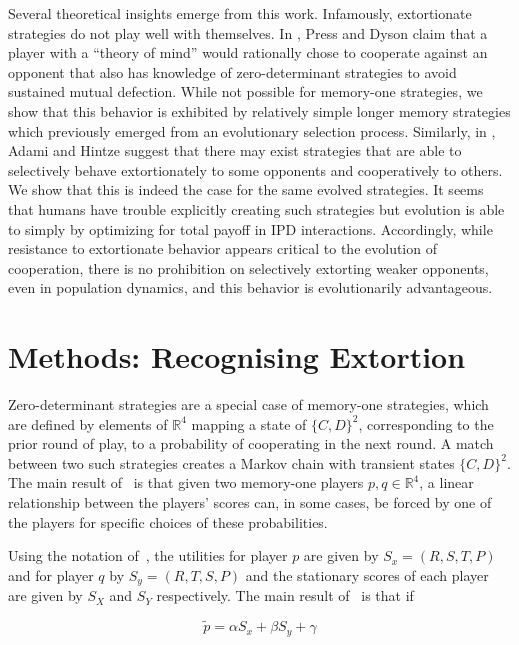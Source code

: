 \documentclass[a4paper]{article}
\begin{document}
Several theoretical insights emerge from this work. Infamously, extortionate
strategies do not play well with themselves. In \cite{Press2012},
Press and Dyson claim that a player with a ``theory of mind'' would
rationally chose to cooperate against an opponent that also has knowledge
of zero-determinant strategies to avoid sustained mutual defection. While not
possible for memory-one strategies, we show that this behavior is exhibited by
relatively simple longer memory strategies which previously emerged from an
evolutionary selection process. Similarly, in
\cite{adami2013evolutionary}, Adami and Hintze suggest that there may exist
strategies that are able to selectively behave extortionately to some opponents
and cooperatively to others. We show that this is indeed the case for the same
evolved strategies. It seems that humans have trouble explicitly creating such
strategies but evolution is able to simply by optimizing for total payoff in IPD
interactions. Accordingly, while resistance to extortionate behavior appears
critical to the evolution of cooperation, there is no prohibition on selectively
extorting weaker opponents, even in population dynamics, and this behavior is
evolutionarily advantageous.


\section{Methods: Recognising Extortion}\label{sec:sserror-zd-strategies}

Zero-determinant strategies are a special case of memory-one strategies,
which are defined by elements of \(\mathbb{R}^4\) mapping a state of
\({\{C, D\}}^2\), corresponding to the prior round of play, to a probability of
cooperating in the next round. A match between two such strategies creates a
Markov chain with transient states \({\{C, D\}}^2\). The main result
of~\cite{Press2012} is that given two memory-one players \(p,
q\in\mathbb{R}^4\), a linear relationship between the players' scores can, in
some cases, be forced by one of the players for specific choices of these
probabilities.

Using the notation of~\cite{Press2012}, the utilities for player \(p\)
are given by \(S_x=(R, S, T, P)\) and for player \(q\) by \(S_y=(R, T, S, P)\)
and the stationary scores of each player are given by \(S_X\) and \(S_Y\)
respectively. The main result of~\cite{Press2012} is that if

\begin{equation}\label{eqn:linear_relationship_for_p}
    \tilde p=\alpha S_x + \beta S_y + \gamma
\end{equation}
\end{document}
